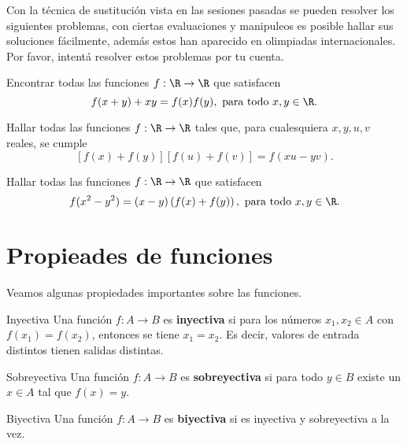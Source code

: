 Con la técnica de sustitución vista en las sesiones pasadas se pueden resolver los siguientes problemas, con ciertas
evaluaciones y manipuleos es posible hallar sus soluciones fácilmente, además estos han aparecido en olimpiadas internacionales.
Por favor, intentá resolver estos problemas por tu cuenta.

\begin{prob-without-section}[India, 2010]
    Encontrar todas las funciones $f: \R \to \R$ que satisfacen
    \[
        f(x + y) + xy = f(x)f(y),\ \text{para todo}\ x,y \in \R.
    \]
\end{prob-without-section}

\begin{prob-without-section}[IMO, 2002]
    Hallar todas las funciones $f: \R \to \R$ tales que, para cualesquiera $x,y,u,v$ reales, se cumple
    \[
        \left[f(x) + f(y)\right]\left[f(u) + f(v)\right] = f(xu - yv).
    \]
\end{prob-without-section}

\begin{prob-without-section}[Korea, 2000]
    Hallar todas las funciones $f : \R \to \R$ que satisfacen
    \[
        f(x^2 - y^2) = (x - y)\left(f(x) + f(y)\right),\ \text{para todo}\ x,y \in \R.
    \]
\end{prob-without-section}

\section{Propieades de funciones}

Veamos algunas propiedades importantes sobre las funciones.
\begin{definition.box}{Inyectiva}{}
    Una función $f : A \to B$ es \textbf{inyectiva} si para los números $x_1, x_2 \in A$ con $f(x_1) = f(x_2)$, entonces se tiene $x_1 = x_2$.
    Es decir, valores de entrada distintos tienen salidas distintas.
\end{definition.box}

\begin{definition.box}{Sobreyectiva}{}
    Una función $f : A \to B$ es \textbf{sobreyectiva} si para todo $y \in B$ existe un $x \in A$ tal que $f(x) = y$.
\end{definition.box}

\begin{definition.box}{Biyectiva}{}
    Una función $f : A \to B$ es \textbf{biyectiva} si es inyectiva y sobreyectiva a la vez.
\end{definition.box}

